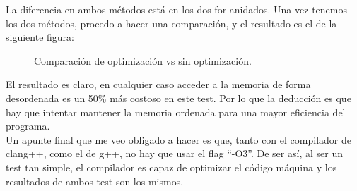 La diferencia en ambos métodos está en los dos for anidados. Una vez tenemos los dos métodos, procedo a hacer una comparación, y el resultado es el de la siguiente figura:
\begin{figure}[ht]
	\centering
	\caption{Comparación de optimización vs sin optimización.}
\end{figure}

El resultado es claro, en cualquier caso acceder a la memoria de forma desordenada es un 50\% más costoso en este test. Por lo que la deducción es que hay que intentar mantener la memoria ordenada para una mayor eficiencia del programa. 
\\
Un apunte final que me veo obligado a hacer es que, tanto con el compilador de clang++, como el de g++, no hay que usar el flag ``-O3''. De ser así, al ser un test tan simple, el compilador es capaz de optimizar el código máquina y los resultados de ambos test son los mismos.


